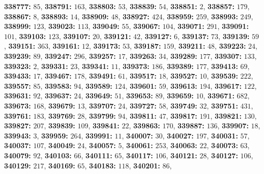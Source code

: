 \textsf{\bfseries 338777:} $85$, \textsf{\bfseries 338791:} $163$, \textsf{\bfseries 338803:} $53$, \textsf{\bfseries 338839:} $54$, \textsf{\bfseries 338851:} $2$, \textsf{\bfseries 338857:} $179$, \textsf{\bfseries 338867:} $8$, \textsf{\bfseries 338893:} $14$, \textsf{\bfseries 338909:} $48$, \textsf{\bfseries 338927:} $424$, \textsf{\bfseries 338959:} $259$, \textsf{\bfseries 338993:} $249$, \textsf{\bfseries 338999:} $123$, \textsf{\bfseries 339023:} $113$, \textsf{\bfseries 339049:} $55$, \textsf{\bfseries 339067:} $104$, \textsf{\bfseries 339071:} $291$, \textsf{\bfseries 339091:} $101$, \textsf{\bfseries 339103:} $123$, \textsf{\bfseries 339107:} $20$, \textsf{\bfseries 339121:} $42$, \textsf{\bfseries 339127:} $6$, \textsf{\bfseries 339137:} $73$, \textsf{\bfseries 339139:} $59$, \textsf{\bfseries 339151:} $363$, \textsf{\bfseries 339161:} $12$, \textsf{\bfseries 339173:} $53$, \textsf{\bfseries 339187:} $159$, \textsf{\bfseries 339211:} $48$, \textsf{\bfseries 339223:} $24$, \textsf{\bfseries 339239:} $89$, \textsf{\bfseries 339247:} $296$, \textsf{\bfseries 339257:} $17$, \textsf{\bfseries 339263:} $34$, \textsf{\bfseries 339289:} $177$, \textsf{\bfseries 339307:} $133$, \textsf{\bfseries 339323:} $2$, \textsf{\bfseries 339331:} $23$, \textsf{\bfseries 339341:} $11$, \textsf{\bfseries 339373:} $186$, \textsf{\bfseries 339389:} $177$, \textsf{\bfseries 339413:} $69$, \textsf{\bfseries 339433:} $17$, \textsf{\bfseries 339467:} $178$, \textsf{\bfseries 339491:} $61$, \textsf{\bfseries 339517:} $18$, \textsf{\bfseries 339527:} $10$, \textsf{\bfseries 339539:} $222$, \textsf{\bfseries 339557:} $85$, \textsf{\bfseries 339583:} $94$, \textsf{\bfseries 339589:} $124$, \textsf{\bfseries 339601:} $59$, \textsf{\bfseries 339613:} $194$, \textsf{\bfseries 339617:} $122$, \textsf{\bfseries 339631:} $92$, \textsf{\bfseries 339637:} $24$, \textsf{\bfseries 339649:} $51$, \textsf{\bfseries 339653:} $89$, \textsf{\bfseries 339659:} $10$, \textsf{\bfseries 339671:} $682$, \textsf{\bfseries 339673:} $168$, \textsf{\bfseries 339679:} $13$, \textsf{\bfseries 339707:} $24$, \textsf{\bfseries 339727:} $58$, \textsf{\bfseries 339749:} $32$, \textsf{\bfseries 339751:} $431$, \textsf{\bfseries 339761:} $183$, \textsf{\bfseries 339769:} $28$, \textsf{\bfseries 339799:} $94$, \textsf{\bfseries 339811:} $47$, \textsf{\bfseries 339817:} $191$, \textsf{\bfseries 339821:} $130$, \textsf{\bfseries 339827:} $207$, \textsf{\bfseries 339839:} $109$, \textsf{\bfseries 339841:} $22$, \textsf{\bfseries 339863:} $170$, \textsf{\bfseries 339887:} $136$, \textsf{\bfseries 339907:} $18$, \textsf{\bfseries 339943:} $3$, \textsf{\bfseries 339959:} $264$, \textsf{\bfseries 339991:} $11$, \textsf{\bfseries 340007:} $30$, \textsf{\bfseries 340027:} $197$, \textsf{\bfseries 340031:} $57$, \textsf{\bfseries 340037:} $107$, \textsf{\bfseries 340049:} $24$, \textsf{\bfseries 340057:} $5$, \textsf{\bfseries 340061:} $253$, \textsf{\bfseries 340063:} $22$, \textsf{\bfseries 340073:} $63$, \textsf{\bfseries 340079:} $92$, \textsf{\bfseries 340103:} $66$, \textsf{\bfseries 340111:} $65$, \textsf{\bfseries 340117:} $106$, \textsf{\bfseries 340121:} $28$, \textsf{\bfseries 340127:} $106$, \textsf{\bfseries 340129:} $217$, \textsf{\bfseries 340169:} $65$, \textsf{\bfseries 340183:} $118$, \textsf{\bfseries 340201:} $86$, 
